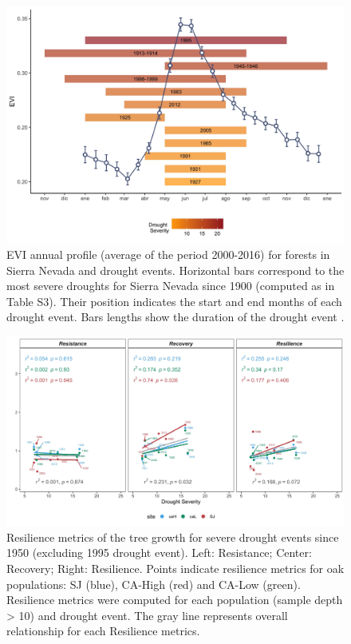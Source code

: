\newpage
\begin{figure}
\centering
\includegraphics[width=\textwidth]{img/dendro/dendro-s4profile} 
\caption{EVI annual profile (average of the period 2000-2016) for \Qp forests in Sierra Nevada and drought events. Horizontal bars correspond to the most severe droughts for Sierra Nevada since 1900 (computed as in Table S3). Their position indicates the start and end months of each drought event. Bars lengths show the duration of the drought event \autocite[number of consecutive months with SPEI lower than -1.28, see][]{Pascoaetal2017DroughtTrends}.}  
\label{fig:dendro:s4profile}
\end{figure}

\newpage
\begin{figure}
\centering
\includegraphics[width=\textwidth]{img/dendro/dendro-s5resilience.jpg} 
\caption{Resilience metrics of the tree growth for severe drought events since 1950 (excluding 1995 drought event). Left: Resistance; Center: Recovery; Right: Resilience. Points indicate resilience metrics for oak populations: SJ (blue), CA-High (red) and CA-Low (green). Resilience metrics were computed for each population (sample depth > 10) and drought event. The gray line represents overall relationship for each Resilience metrics.}  
\label{fig:dendro:s5resilience}
\end{figure}


